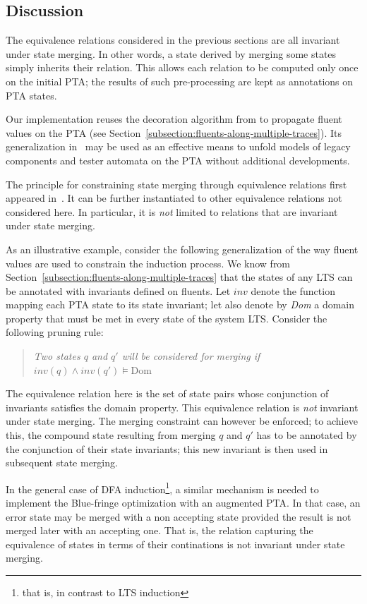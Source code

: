 \subsection{Discussion\label{subsection:qsm-constraints-implementation-notes}}

The equivalence relations considered in the previous sections are all invariant under state merging. In other words, a state derived by merging some states simply inherits their relation. This allows each relation to be computed only once on the initial PTA; the results of such pre-processing are kept as annotations on PTA states. 

Our implementation reuses the decoration algorithm from \cite{Damas:2006} to propagate fluent values on the PTA (see Section~\ref{subsection:fluents-along-multiple-traces}). Its generalization in~\cite{Damas:2011} may be used as an effective means to unfold models of legacy components and tester automata on the PTA without additional developments.

The principle for constraining state merging through equivalence relations first appeared in~\cite{Coste:1998, Coste:2004}. It can be further instantiated to other equivalence relations not considered here. In particular, it is \emph{not} limited to relations that are invariant under state merging.

As an illustrative example, consider the following generalization of the way fluent values are used to constrain the induction process. We know from Section~\ref{subsection:fluents-along-multiple-traces} that the states of any LTS can be annotated with invariants defined on fluents. Let $inv$ denote the function mapping each PTA state to its state invariant; let also denote by \emph{Dom} a domain property that must be met in every state of the system LTS. Consider the following pruning rule:
\begin{quote}
\emph{Two states $q$ and $q'$ will be considered for merging if $inv(q) \wedge inv(q') \models \mbox{Dom}$}
\end{quote}

The equivalence relation here is the set of state pairs whose conjunction of invariants satisfies the domain property. This equivalence relation is \emph{not} invariant under state merging. The merging constraint can however be enforced; to achieve this, the compound state resulting from merging $q$ and $q'$ has to be annotated by the conjunction of their state invariants; this new invariant is then used in subsequent state merging.

In the general case of DFA induction\footnote{that is, in contrast to LTS induction}, a similar mechanism is needed to implement the Blue-fringe optimization with an augmented PTA. In that case, an error state may be merged with a non accepting state provided the result is not merged later with an accepting one. That is, the relation capturing the equivalence of states in terms of their continations is not invariant under state merging.
